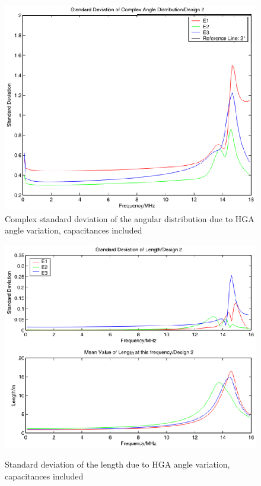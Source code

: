 \documentclass[a4paper,14pt]{extbook}
\begin{document}
\begin{figure}[h]
\begin{center}
\includegraphics[width=12cm]{VirtualSigma1D2HGA_caps.eps}\\
\caption{Complex standard deviation of the angular distribution due to HGA angle variation, capacitances included} \label{fig_VirtualSigma1_HGA_D2_caps}
\includegraphics[width=12cm]{VirtualSigma2D2HGA_caps.eps} \\
\caption{Standard deviation of the length due to HGA angle variation, capacitances included} \label{fig_VirtualSigma2_HGA_D2_caps}
\end{center}
\end{figure}
\end{document}
